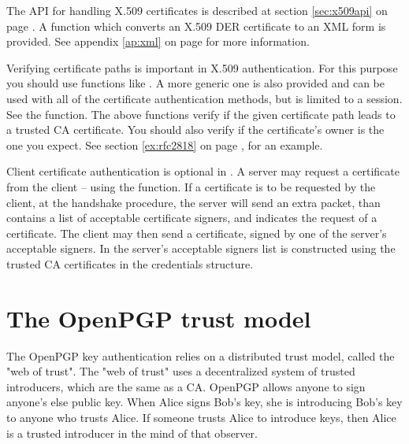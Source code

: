 The API for handling X.509 certificates is described at section \ref{sec:x509api}
on page \pageref{sec:x509api}. A function which converts an X.509 DER certificate
to an XML form is provided. See appendix \ref{ap:xml} on page \pageref{ap:xml} for
more information.


\par
Verifying certificate paths is important 
in X.509 authentication. For this purpose you should use functions like
.
A more generic one is also provided and can be used with all
of the certificate authentication methods, but is limited to a session. See the
function. The above functions verify if the given certificate path leads
to a trusted CA certificate. You should also verify if the certificate's
owner is the one you expect. See section \ref{ex:rfc2818} on page \pageref{ex:rfc2818},
for an example.

\par
Client certificate authentication is 
optional in \tls{}. A server may request a certificate from the client -- using the
function. If a certificate is to be requested by the client, at the handshake 
procedure, the server will send an extra packet,
than contains a list of acceptable certificate signers, and indicates the
request of a certificate. The client may then send a certificate, signed
by one of the server's acceptable signers. In \gnutls{} the server's acceptable
signers list is constructed using the trusted CA certificates in the
credentials structure.


\section{The OpenPGP trust model}
\label{pgp:trust}

The OpenPGP key authentication relies on a distributed trust model, called
the "web of trust". The "web of trust" uses a decentralized system of 
trusted introducers, which are the same as a CA. OpenPGP allows anyone to 
sign anyone's else public key. When Alice signs Bob's key, she is introducing 
Bob's key to anyone who trusts Alice. If someone trusts Alice to introduce
keys, then Alice is a trusted introducer in the mind of that observer.

